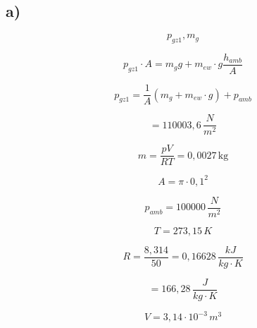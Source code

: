 

\subsection*{a)}

\[
p_{gz1}, m_g
\]

\[
p_{gz1} \cdot A = m_g g + m_{ew} \cdot g \frac{h_{amb}}{A}
\]

\[
p_{gz1} = \frac{1}{A} (m_g + m_{ew} \cdot g) + p_{amb}
\]

\[
= 110003,6 \, \frac{N}{m^2}
\]

\[
m = \frac{p V}{R T} = 0,0027 \, \text{kg}
\]

\[
A = \pi \cdot 0,1^2
\]

\[
p_{amb} = 100000 \, \frac{N}{m^2}
\]

\[
T = 273,15 \, K
\]

\[
R = \frac{8,314}{50} = 0,16628 \, \frac{kJ}{kg \cdot K}
\]

\[
= 166,28 \, \frac{J}{kg \cdot K}
\]

\[
V = 3,14 \cdot 10^{-3} \, m^3
\]